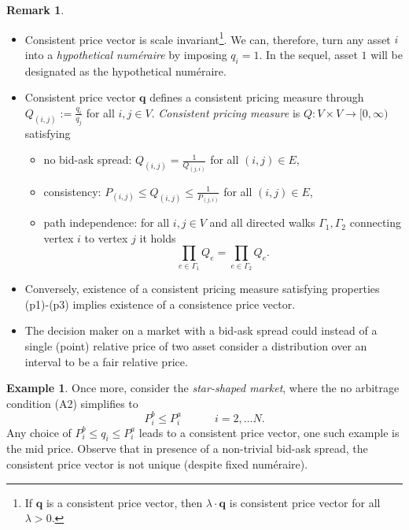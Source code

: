 \documentclass{article}
\theoremstyle{definition}
\newtheorem{example}[theorem]{Example}
\newtheorem{remark}[theorem]{Remark}
\def\bq{\mathbf{q}}
\begin{document}
\begin{remark} %
\begin{itemize}
    \item[(i)] Consistent price vector is scale invariant\footnote{If $\bq$ is a consistent price vector, then $\lambda \cdot \bq$ is consistent price vector for all $\lambda > 0$.}. We can, therefore, turn any asset $i$ into a \emph{hypothetical num\'eraire} by imposing $q_i = 1$. In the sequel, asset $1$ will be designated as the hypothetical num\'eraire. 

    \item[(ii)] Consistent price vector $\bq$ defines a consistent pricing measure through $Q_{(i,j)} := \frac{q_i}{q_j}$ for all $i, j \in V$. \emph{Consistent pricing measure} is $Q: V \times V \to [0,\infty)$ satisfying
    \begin{itemize}
    \item[(p1)] no bid-ask spread: $Q_{(i,j)} = \frac{1}{Q_{(j, i)}}$  for all $(i,j)\in E$, 
    \item[(p2)] consistency: $P_{(i,j)} \leq Q_{(i,j)} \leq \frac{1}{P_{(j, i)}}$  for all $(i,j)\in E$,
    \item[(p3)] path independence: for all $i, j \in V$ and all directed walks $\Gamma_1, \Gamma_2$ connecting vertex $i$ to vertex $j$ it holds 
    \[
     \prod_{e \in \Gamma_1} Q_e = \prod_{e \in \Gamma_2} Q_e.   
    \]
    \end{itemize}
    \item[(iii)] Conversely, existence of a consistent pricing measure satisfying properties (p1)-(p3) implies existence of a consistence price vector.

    \item[(iv)] The decision maker on a market with a bid-ask spread could instead of a single (point) relative price of two asset consider a distribution over an interval to be a fair relative price.
\end{itemize}    
\end{remark}

\begin{example}\label{ex:star3}
Once more, consider the \emph{star-shaped market}, where the no arbitrage condition (A2) simplifies to
\[
P^b_i \leq P^a_i \quad \quad \quad  i = 2, \dots N.
\]
Any choice of $P^b_i \leq q_i \leq P^a_i$ leads to a consistent price vector, one such example is the mid price. Observe that in presence of a non-trivial bid-ask spread, the consistent price vector is not unique (despite fixed num\'eraire).
\end{example}
\end{document}
